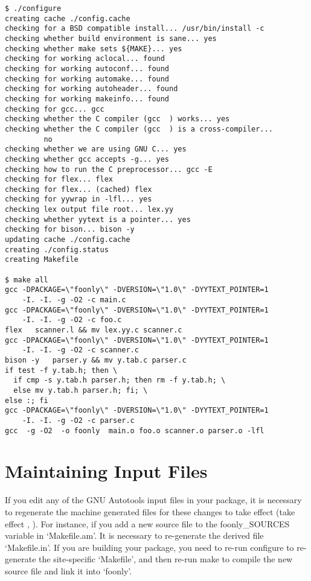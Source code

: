 \begin{Verbatim}[frame=single]
$ ./configure
creating cache ./config.cache
checking for a BSD compatible install... /usr/bin/install -c
checking whether build environment is sane... yes
checking whether make sets ${MAKE}... yes
checking for working aclocal... found
checking for working autoconf... found
checking for working automake... found
checking for working autoheader... found
checking for working makeinfo... found
checking for gcc... gcc
checking whether the C compiler (gcc  ) works... yes
checking whether the C compiler (gcc  ) is a cross-compiler... 
         no
checking whether we are using GNU C... yes
checking whether gcc accepts -g... yes
checking how to run the C preprocessor... gcc -E
checking for flex... flex
checking for flex... (cached) flex
checking for yywrap in -lfl... yes
checking lex output file root... lex.yy
checking whether yytext is a pointer... yes
checking for bison... bison -y
updating cache ./config.cache
creating ./config.status
creating Makefile

$ make all
gcc -DPACKAGE=\"foonly\" -DVERSION=\"1.0\" -DYYTEXT_POINTER=1  
    -I. -I. -g -O2 -c main.c
gcc -DPACKAGE=\"foonly\" -DVERSION=\"1.0\" -DYYTEXT_POINTER=1  
    -I. -I. -g -O2 -c foo.c
flex   scanner.l && mv lex.yy.c scanner.c
gcc -DPACKAGE=\"foonly\" -DVERSION=\"1.0\" -DYYTEXT_POINTER=1  
    -I. -I. -g -O2 -c scanner.c
bison -y   parser.y && mv y.tab.c parser.c
if test -f y.tab.h; then \
  if cmp -s y.tab.h parser.h; then rm -f y.tab.h; \
  else mv y.tab.h parser.h; fi; \
else :; fi
gcc -DPACKAGE=\"foonly\" -DVERSION=\"1.0\" -DYYTEXT_POINTER=1  
    -I. -I. -g -O2 -c parser.c
gcc  -g -O2  -o foonly  main.o foo.o scanner.o parser.o -lfl 
\end{Verbatim}

\section{Maintaining Input Files}


If you edit any of the GNU Autotools input files in your package, it is necessary to regenerate the machine generated files for these changes to
take effect (take effect {\McQ{}}, {\MbQ{}}). For instance, if you add a new source file to the foonly\_{}SOURCES variable in `Makefile.am'. It is necessary to re-generate the derived file `Makefile.in'. If you are building your package, you need to re-run configure to re-generate the site-specific `Makefile', and then re-run make to compile the new source file and link it into `foonly'. 


